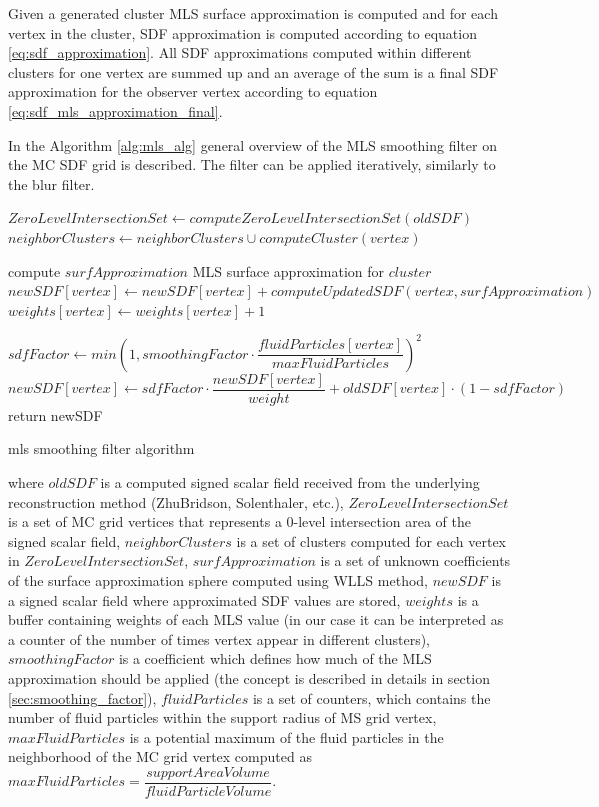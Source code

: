Given a generated cluster MLS surface approximation is computed and for each vertex in the cluster, SDF approximation is computed according to equation \ref{eq:sdf_approximation}. All SDF approximations computed within different clusters for one vertex are summed up and an average of the sum is a final SDF approximation for the observer vertex according to equation \ref{eq:sdf_mls_approximation_final}.

In the Algorithm \ref{alg:mls_alg} general overview of the MLS smoothing filter on the MC SDF grid is described. The filter can be applied iteratively, similarly to the blur filter.
\begin{algorithm}[H]
	\scriptsize
	\begin{algorithmic}
		\State $ZeroLevelIntersectionSet \gets computeZeroLevelIntersectionSet(oldSDF)$
			\State $neighborClusters \gets neighborClusters \cup computeCluster(vertex)$
		\EndFor
			
			\State compute $surfApproximation$ MLS surface approximation for $cluster$
				\State $newSDF[vertex] \gets newSDF[vertex] + computeUpdatedSDF(vertex, surfApproximation)$
				\State $weights[vertex] \gets weights[vertex] + 1$
			\EndFor
		\EndFor

			\State $sdfFactor \gets min\left(1, smoothingFactor \cdot \dfrac{fluidParticles[vertex]}{maxFluidParticles}\right)^2$
			\State $newSDF[vertex] \gets sdfFactor \cdot \dfrac{newSDF[vertex]}{weight} + oldSDF[vertex] \cdot (1 - sdfFactor)$
		\EndFor
		\State return newSDF
	\end{algorithmic}
	\caption{mls smoothing filter algorithm}
	\label{alg:mls_alg}
\end{algorithm}
where $oldSDF$ is a computed signed scalar field received from the underlying reconstruction method (ZhuBridson, Solenthaler, etc.), $ZeroLevelIntersectionSet$ is a set of MC grid vertices that represents a 0-level intersection area of the signed scalar field, $neighborClusters$ is a set of clusters computed for each vertex in $ZeroLevelIntersectionSet$, $surfApproximation$ is a set of unknown coefficients of the surface approximation sphere computed using WLLS method, $newSDF$ is a signed scalar field where approximated SDF values are stored, $weights$ is a buffer containing weights of each MLS value (in our case it can be interpreted as a counter of the number of times vertex appear in different clusters), $smoothingFactor$ is a coefficient which defines how much of the MLS approximation should be applied (the concept is described in details in section \ref{sec:smoothing_factor}), $fluidParticles$ is a set of counters, which contains the number of fluid particles within the support radius of MS grid vertex, $maxFluidParticles$ is a potential maximum of the fluid particles in the neighborhood of the MC grid vertex computed as $maxFluidParticles = \dfrac{supportAreaVolume}{fluidParticleVolume}$.

